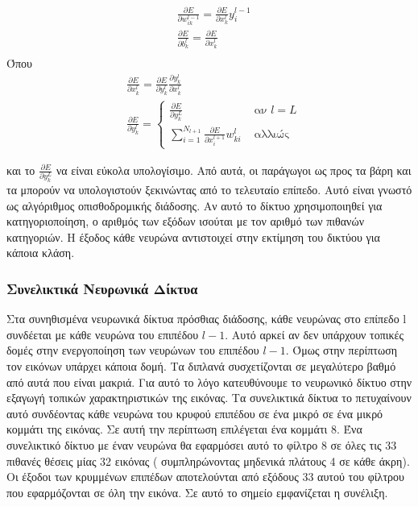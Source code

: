 \begin{align*}
&\frac{\partial E}{\partial w_{i k}^{l-1}}=\frac{\partial E}{\partial x_k^l} y_i^{l-1}\\
&\frac{\partial E}{\partial b_k^l}=\frac{\partial E}{\partial x_k^l}\\
\end{align*}
Όπου 
\begin{align*}
&\frac{\partial E}{\partial x_k^l}=\frac{\partial E}{\partial y_k^l} \frac{\partial y_k^l}{\partial x_k^l}\\
&\frac{\partial E}{\partial y_k^l}= \begin{cases}\frac{\partial E}{\partial y_k^L} & \text { αν } l=L \\ \sum_{i=1}^{N_{l+1}} \frac{\partial E}{\partial x_i^{l+1}} w_{k i}^l & \text { αλλιώς }\end{cases}
\end{align*}

και το $\frac{\partial{E}}{\partial y_k^L}$  να είναι εύκολα υπολογίσιμο. Από αυτά, οι παράγωγοι ως προς τα βάρη και τα  μπορούν να υπολογιστούν ξεκινώντας από το τελευταίο επίπεδο. Αυτό είναι γνωστό ως αλγόριθμος οπισθοδρομικής διάδοσης. 
Αν αυτό το δίκτυο χρησιμοποιηθεί για κατηγοριοποίηση, ο αριθμός των εξόδων ισούται με τον αριθμό των πιθανών κατηγοριών. Η έξοδος κάθε νευρώνα αντιστοιχεί στην εκτίμηση του δικτύου για κάποια κλάση.  

\subsubsection{Συνελικτικά Νευρωνικά Δίκτυα}
Στα συνηθισμένα νευρωνικά δίκτυα πρόσθιας διάδοσης, κάθε νευρώνας στο επίπεδο l συνδέεται με κάθε νευρώνα του επιπέδου $l-1$. Αυτό αρκεί αν δεν υπάρχουν τοπικές δομές στην ενεργοποίηση των νευρώνων του επιπέδου $l-1$. Όμως στην περίπτωση τον εικόνων υπάρχει κάποια δομή. Τα διπλανά  συσχετίζονται σε μεγαλύτερο βαθμό από αυτά που είναι μακριά. Για αυτό το λόγο κατευθύνουμε το νευρωνικό δίκτυο στην εξαγωγή τοπικών χαρακτηριστικών της εικόνας. Τα συνελικτικά δίκτυα το πετυχαίνουν αυτό συνδέοντας κάθε νευρώνα του κρυφού επιπέδου σε ένα μικρό σε ένα μικρό κομμάτι της εικόνας. Σε αυτή την περίπτωση επιλέγεται ένα κομμάτι 8. Ένα συνελικτικό δίκτυο με έναν νευρώνα θα εφαρμόσει αυτό το φίλτρο 8 σε όλες τις 33 πιθανές θέσεις μίας 32 εικόνας ( συμπληρώνοντας μηδενικά πλάτους 4  σε κάθε άκρη). Οι έξοδοι των κρυμμένων επιπέδων αποτελούνται από εξόδους 33 αυτού του φίλτρου που εφαρμόζονται σε όλη την εικόνα. Σε αυτό το σημείο εμφανίζεται η συνέλιξη.

